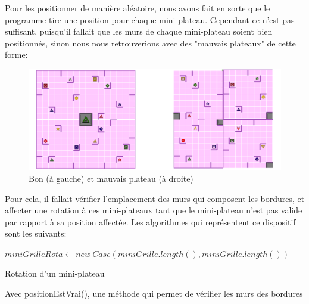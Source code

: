 \documentclass[a4paper, 12pt]{article}
\begin{document}
            Pour les positionner de manière aléatoire, nous avons fait en sorte que le programme tire une position pour chaque mini-plateau. Cependant ce n'est pas suffisant, puisqu'il fallait que les murs de chaque mini-plateau soient bien positionnés, sinon nous nous retrouverions avec des "mauvais plateaux" de cette forme:
            
            \begin{figure}[H]
                \centering
                \includegraphics[scale=0.2]{images/bonvsmauvais.png}
                \caption{Bon (à gauche) et mauvais plateau (à droite)}
            \end{figure}
            
            
            Pour cela, il fallait vérifier l'emplacement des murs qui composent les bordures, et affecter une rotation à ces mini-plateaux tant que le mini-plateau n'est pas valide par rapport à sa position affectée. Les algorithmes qui représentent ce dispositif sont les suivants:
            
            \newpage
            
            \begin{algorithm}[H]%
                \DontPrintSemicolon
                $miniGrilleRota \gets new \ Case(miniGrille.length(), miniGrille.length())$
                
                \;
                \caption{\sc Rotation d'un mini-plateau}
                Avec positionEstVrai(), une méthode qui permet de vérifier les murs des bordures
            \end{algorithm}%
        
\end{document}
